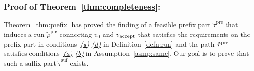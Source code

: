 \documentclass[Afour,sageh,times]{sagej}
\newcommand{\vertex}[1]{v_{\textup{#1}}}
\begin{document}
{{%

\subsubsection{Proof of Theorem~\ref{thm:completeness}:}\label{app:completeness_}
Theorem~\ref{thm:prefix} has proved the finding of a feasible prefix part $\tilde{\tau}^{\text{pre}}$ that induces a run $\tilde{\rho}^{\text{pre}}$ connecting $v_0$ and $\vertex{accept}$ that satisfies the requirements on the prefix part in conditions~\hyperref[cond:a]{\it (a)}-\hyperref[cond:d]{\it (d)} in Definition~\ref{defn:run} and the path $\tilde{\tau}^{\textup{pre}}$ satisfies conditions~\hyperref[asmp:a]{\it (a)}-\hyperref[asmp:b]{\it (b)} in Assumption~\ref{asmp:same}. Our goal is to prove that  such a suffix part $\tilde{\tau}^\text{suf}$ exists.

}}
\end{document}
